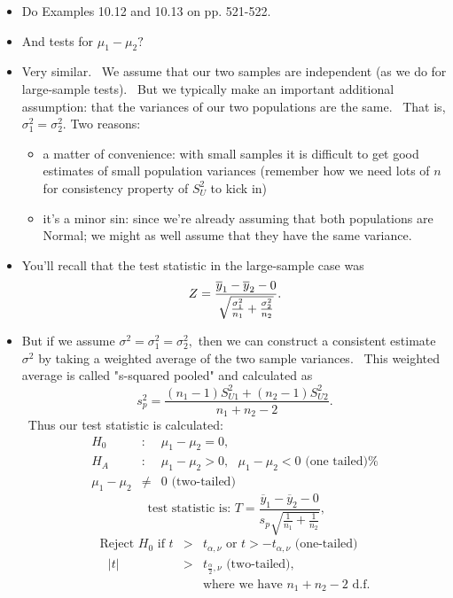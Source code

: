 \documentclass[11pt]{article}
\begin{document}
\begin{itemize}
\item Do Examples 10.12 and 10.13 on pp. 521-522.

\item And tests for $\mu _{1}-\mu _{2}?$

\item Very similar. \ We assume that our two samples are independent (as we
do for large-sample tests). \ But we typically make an important additional
assumption: that the variances of our two populations are the same. \ That
is, $\sigma _{1}^{2}=\sigma _{2}^{2}.$ Two reasons:

\begin{itemize}
\item a matter of convenience: with small samples it is difficult to get
good estimates of small population variances (remember how we need lots of $n
$ for consistency property of $S_{U}^{2}$ to kick in)

\item it's a minor sin: since we're already assuming that both populations
are Normal; we might as well assume that they have the same variance.
\end{itemize}

\item You'll recall that the test statistic in the large-sample case was%
\begin{equation*}
Z=\frac{\overline{y}_{1}-\overline{y}_{2}-0}{\sqrt{\frac{\sigma _{1}^{2}}{%
n_{1}}+\frac{\sigma _{2}^{2}}{n_{2}}}}.
\end{equation*}

\item But if we assume $\sigma ^{2}=\sigma _{1}^{2}=\sigma _{2}^{2},$ then
we can construct a consistent estimate $\sigma ^{2}$ by taking a weighted
average of the two sample variances. \ This weighted average is called
"s-squared pooled" and calculated as%
\begin{equation*}
s_{p}^{2}=\frac{\left( n_{1}-1\right) S_{U1}^{2}+\left( n_{2}-1\right)
S_{U2}^{2}}{n_{1}+n_{2}-2}.
\end{equation*}%
\ Thus our test statistic is calculated:%
\begin{eqnarray*}
H_{0} &:&\mu _{1}-\mu _{2}=0, \\
H_{A} &:&\mu _{1}-\mu _{2}>0,\text{ }\mu _{1}-\mu _{2}<0\text{ \ (one tailed)%
} \\
\mu _{1}-\mu _{2} &\neq &0\text{ \ (two-tailed)}
\end{eqnarray*}%
\begin{equation*}
\text{ test statistic is: }T=\frac{\overline{y}_{1}-\overline{y}_{2}-0}{s_{p}%
\sqrt{\frac{1}{n_{1}}+\frac{1}{n_{2}}}},
\end{equation*}%
\begin{eqnarray*}
\text{Reject }H_{0}\text{ if }t &>&t_{\alpha ,\nu }\text{ or }t>-t_{\alpha
,\nu }\text{ \ (one-tailed)} \\
\text{ }|t| &>&t_{\frac{\alpha }{2},\nu }\text{ \ (two-tailed),} \\
&&\text{where we have }n_{1}+n_{2}-2\text{ \ d.f.}
\end{eqnarray*}


\end{itemize}
\end{document}
